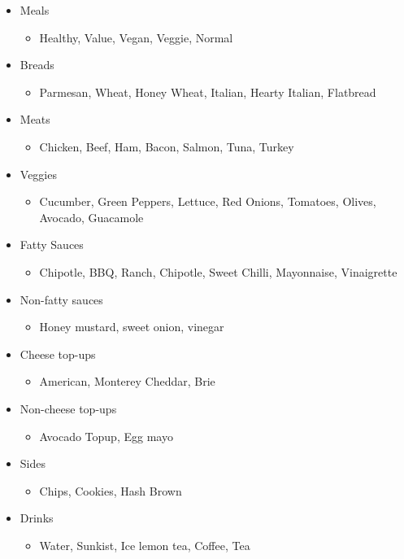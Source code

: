 \documentclass{article}
\begin{document}
\begin{itemize}
\item Meals
\begin{itemize}
\item Healthy, Value, Vegan, Veggie, Normal
\end{itemize}
\item Breads
\begin{itemize}
\item Parmesan, Wheat, Honey Wheat, Italian, Hearty Italian, Flatbread
\end{itemize}
\item Meats
\begin{itemize}
\item Chicken, Beef, Ham, Bacon, Salmon, Tuna, Turkey
\end{itemize}
\item Veggies
\begin{itemize}
\item Cucumber, Green Peppers, Lettuce, Red Onions, Tomatoes, Olives, Avocado, Guacamole
\end{itemize}
\item Fatty Sauces
\begin{itemize}
\item Chipotle, BBQ, Ranch, Chipotle, Sweet Chilli, Mayonnaise, Vinaigrette
\end{itemize}
\item Non-fatty sauces
\begin{itemize}
\item Honey mustard, sweet onion, vinegar
\end{itemize}
\item Cheese top-ups
\begin{itemize}
\item American, Monterey Cheddar, Brie
\end{itemize}
\item Non-cheese top-ups
\begin{itemize}
\item Avocado Topup, Egg mayo
\end{itemize}
\item Sides
\begin{itemize}
\item Chips, Cookies, Hash Brown
\end{itemize}
\item Drinks
\begin{itemize}
\item Water, Sunkist, Ice lemon tea, Coffee, Tea
\end{itemize}
\end{itemize}
\end{document}
